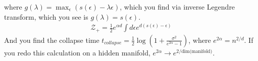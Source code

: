where $g(\lambda) = \max_\epsilon (s(\epsilon) - \lambda \epsilon)$, which you find via inverse Legendre transform, which you see is $g(\lambda) = s(\epsilon)$.
\begin{align}
	\mathcal Z_+ = \frac{1}{2}e^{\alpha d} \int d\epsilon e^{d(s(\epsilon) -\epsilon)}
\end{align}
And you find the collapse time $t_{collapse} = \frac{1}{2} \log (1 + \frac{\sigma^2}{e^{2\alpha} - 1})$, where $e^{2\alpha} = n^{2/d}$. If you redo this calculation on a hidden manifold, $e^{2\alpha} \to e^{2/\text{dim(manifold)}}$.

















